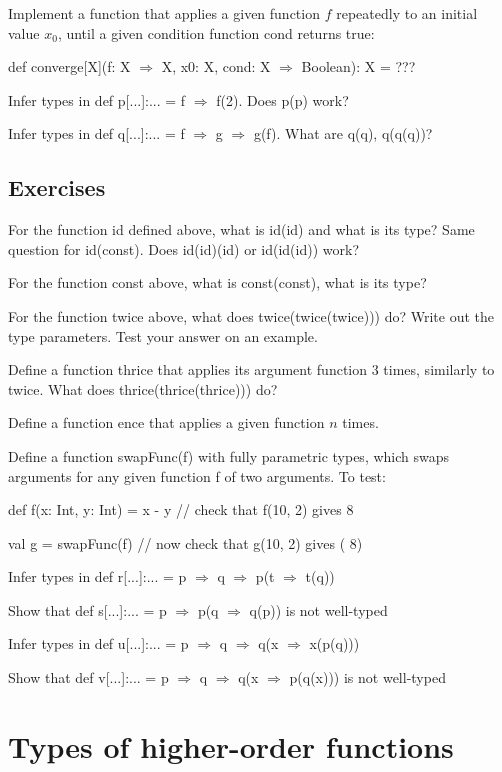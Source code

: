 Implement a function that applies a given function $f$ repeatedly
to an initial value $x_{0}$, until a given condition function cond
returns true:

def converge{[}X{]}(f: X $\Rightarrow$ X, x0: X, cond: X $\Rightarrow$
Boolean): X = ???

Infer types in def p{[}...{]}:... = f $\Rightarrow$ f(2). Does p(p)
work?

Infer types in def q{[}...{]}:... = f $\Rightarrow$ g $\Rightarrow$
g(f). What are q(q), q(q(q))?

\subsection{Exercises}

For the function id defined above, what is id(id) and what is its
type? Same question for id(const). Does id(id)(id) or id(id(id)) work? 

For the function const above, what is const(const), what is its type?

For the function twice above, what does twice(twice(twice))) do? Write
out the type parameters. Test your answer on an example.

Define a function thrice that applies its argument function 3 times,
similarly to twice. What does thrice(thrice(thrice))) do?

Define a function ence that applies a given function $n$ times.

Define a function swapFunc(f) with fully parametric types, which swaps
arguments for any given function f of two arguments. To test: 

def f(x: Int, y: Int) = x - y // check that f(10, 2) gives 8

val g = swapFunc(f)  // now check that g(10, 2) gives (\textendash{}
8)

Infer types in def r{[}...{]}:... = p $\Rightarrow$ q $\Rightarrow$
p(t $\Rightarrow$ t(q))

Show that def s{[}...{]}:... = p $\Rightarrow$ p(q $\Rightarrow$
q(p)) is not well-typed

Infer types in def u{[}...{]}:... = p $\Rightarrow$ q $\Rightarrow$
q(x $\Rightarrow$ x(p(q)))

Show that def v{[}...{]}:... = p $\Rightarrow$ q $\Rightarrow$ q(x
$\Rightarrow$ p(q(x))) is not well-typed

\section{Types of higher-order functions}

